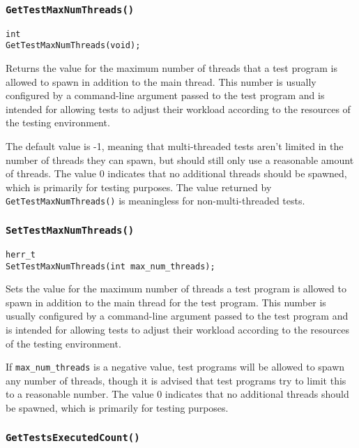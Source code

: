 \documentclass[../HDF5_RFC.tex]{subfiles}
\begin{document}
\subsubsection{\texttt{GetTestMaxNumThreads()}}
\label{apdx:testframe_gettestmaxnumthreads}

\begin{verbatim}
int
GetTestMaxNumThreads(void);
\end{verbatim}

Returns the value for the maximum number of threads that a test program is allowed to spawn in addition
to the main thread. This number is usually configured by a command-line argument passed to
the test program and is intended for allowing tests to adjust their workload according to the resources
of the testing environment.

The default value is -1, meaning that multi-threaded tests aren't limited in the number of threads they
can spawn, but should still only use a reasonable amount of threads. The value 0 indicates that no additional threads should be spawned, which is primarily for testing purposes. The value returned by \texttt{GetTestMaxNumThreads()} is meaningless for non-multi-threaded tests.

\subsubsection{\texttt{SetTestMaxNumThreads()}}

\begin{verbatim}
herr_t
SetTestMaxNumThreads(int max_num_threads);
\end{verbatim}

Sets the value for the maximum number of threads a test program is allowed to spawn in addition to the
main thread for the test program. This number is usually configured by a command-line argument passed to
the test program and is intended for allowing tests to adjust their workload according to the resources
of the testing environment.

If \texttt{max\_num\_threads} is a negative value, test programs will be allowed to spawn any number of
threads, though it is advised that test programs try to limit this to a reasonable number. The value 0
indicates that no additional threads should be spawned, which is primarily for testing purposes.

\subsubsection{\texttt{GetTestsExecutedCount()}}
\end{document}
